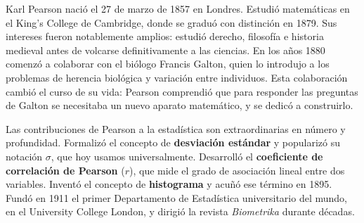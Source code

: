 \documentclass[11pt, letterpaper]{article}
\begin{document}
\begin{tcolorbox}[enhanced, breakable,
  colback=white, colframe=blockc, colbacktitle=blockc,
  coltitle=white, arc=4pt, leftrule=5pt,
  left=10pt, right=10pt, top=12pt, bottom=10pt,
  fonttitle=\bfseries,
  attach boxed title to top left={xshift=0.5cm, yshift*=-\tcboxedtitleheight/2},
  boxed title style={colframe=blockc, colback=blockc, arc=2pt},
  title={Karl Pearson \hfill \normalfont\itshape 1857 --- 1936}]

\begin{minipage}[t]{0.78\linewidth}
\vspace{0pt}

Karl Pearson naci\'o el 27 de marzo de 1857 en Londres. Estudi\'o matem\'aticas en el King's College de Cambridge, donde se gradu\'o con distinci\'on en 1879. Sus intereses fueron notablemente amplios: estudi\'o derecho, filosof\'ia e historia medieval antes de volcarse definitivamente a las ciencias. En los a\~nos 1880 comenz\'o a colaborar con el bi\'ologo Francis Galton, quien lo introdujo a los problemas de herencia biol\'ogica y variaci\'on entre individuos. Esta colaboraci\'on cambi\'o el curso de su vida: Pearson comprendi\'o que para responder las preguntas de Galton se necesitaba un nuevo aparato matem\'atico, y se dedic\'o a construirlo.

\medskip
Las contribuciones de Pearson a la estad\'istica son extraordinarias en n\'umero y profundidad. Formaliz\'o el concepto de \textbf{desviaci\'on est\'andar} y populariz\'o su notaci\'on $\sigma$, que hoy usamos universalmente. Desarroll\'o el \textbf{coeficiente de correlaci\'on de Pearson} ($r$), que mide el grado de asociaci\'on lineal entre dos variables. Invent\'o el concepto de \textbf{histograma} y acu\~n\'o ese t\'ermino en 1895. Fund\'o en 1911 el primer Departamento de Estad\'istica universitario del mundo, en el University College London, y dirigi\'o la revista \textit{Biometrika} durante d\'ecadas.


\end{minipage}
\end{tcolorbox}
\end{document}
